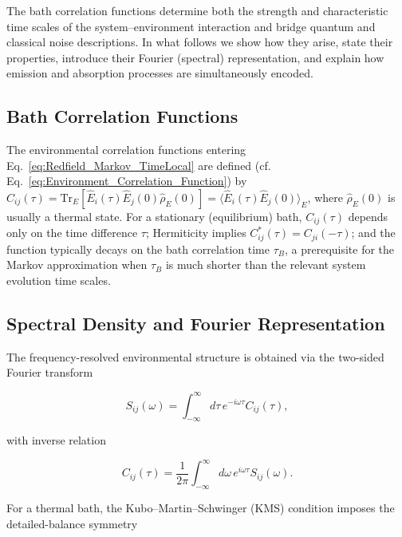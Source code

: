 \noindent
The bath correlation functions determine both the strength and characteristic time scales of the system--environment interaction and bridge quantum and classical noise descriptions. In what follows we show how they arise, state their properties, introduce their Fourier (spectral) representation, and explain how emission and absorption processes are simultaneously encoded.


\subsection{Bath Correlation Functions}
\label{subsec:bath_correlation_functions}

\noindent
The environmental correlation functions entering Eq.~\eqref{eq:Redfield_Markov_TimeLocal} are defined (cf. Eq.~\eqref{eq:Environment_Correlation_Function}) by $C_{ij}(\tau) = \mathrm{Tr}_E[\hat{E}_i(\tau) \hat{E}_j(0) \hat{\rho}_E(0)] = \langle \hat{E}_i(\tau) \hat{E}_j(0) \rangle_E$, where $\hat{\rho}_E(0)$ is usually a thermal state. For a stationary (equilibrium) bath, $C_{ij}(\tau)$ depends only on the time difference $\tau$; Hermiticity implies $C_{ij}^*(\tau)=C_{ji}(-\tau)$; and the function typically decays on the bath correlation time $\tau_B$, a prerequisite for the Markov approximation when $\tau_B$ is much shorter than the relevant system evolution time scales.


\subsection{Spectral Density and Fourier Representation}
\label{subsec:spectral_density_representation}

\noindent
The frequency-resolved environmental structure is obtained via the two-sided Fourier transform

\begin{equation}
	S_{ij}(\omega) = \int_{-\infty}^{\infty} d\tau \, e^{-i\omega \tau} C_{ij}(\tau),
	\label{eq:spectral_density}
\end{equation}

\noindent
with inverse relation

\begin{equation}
	C_{ij}(\tau) = \frac{1}{2\pi} \int_{-\infty}^{\infty} d\omega \, e^{i\omega \tau} S_{ij}(\omega).
	\label{eq:inverse_spectral_density}
\end{equation}

\noindent
For a thermal bath, the Kubo--Martin--Schwinger (KMS) condition imposes the detailed-balance symmetry

